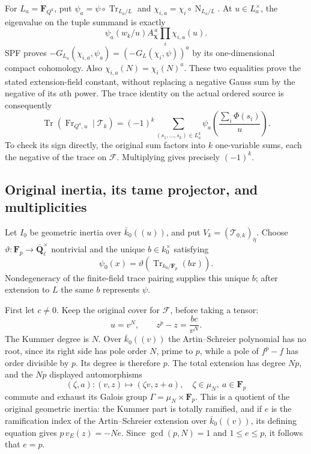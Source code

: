 For \(L_a=\mathbf F_{Q^a}\), put
\(\psi_a=\psi\circ\operatorname{Tr}_{L_a/L}\) and
\(\chi_{i,a}=\chi_i\circ\operatorname{N}_{L_a/L}\).
At \(u\in L_a^\times\), the eigenvalue on the tuple summand
is exactly
\[
 \psi_a(w_k/u) A_{\boldsymbol\chi}^{\,a}
              \prod_i\chi_{i,a}(u).
 \tag{TPF.10}\label{eq:TPF10}
\]
SPF proves \(-G_{L_a}(\chi_{i,a},\psi_a)
=(-G_L(\chi_i,\psi))^a\) by its one-dimensional compact
cohomology. Also \(\chi_{i,a}(N)=\chi_i(N)^a\).
These two equalities prove the stated extension-field
constant, without replacing a negative Gauss sum by
the negative of its \(a\)th power. The trace identity on
the actual ordered source is consequently
\[
 \operatorname{Tr}(\operatorname{Fr}_{Q^a,u}\mid\mathcal T_k)
 =(-1)^k\sum_{(s_1,\ldots,s_k)\in L_a^k}
       \psi_a\left(\frac{\sum_i\Phi(s_i)}u\right).
 \tag{TPF.11}\label{eq:TPF11}
\]
To check its sign directly, the original sum factors into
\(k\) one-variable sums, each the negative of the trace on
\(\mathcal F\). Multiplying gives precisely \((-1)^k\).

\subsection{Original inertia, its tame projector, and multiplicities}

Let \(I_0\) be geometric inertia over \(\bar k_0((u))\),
and put \(V_k=(\mathcal T_{0,k})_{\bar\eta}\).
Choose \(\vartheta:\mathbf F_p\to
\overline{\mathbf Q}_\ell^\times\) nontrivial and the unique
\(b\in k_0^\times\) satisfying
\[
 \psi_0(x)=\vartheta(\operatorname{Tr}_{k_0/\mathbf F_p}(bx)).
 \tag{TPF.12}\label{eq:TPF12}
\]
Nondegeneracy of the finite-field trace pairing supplies
this unique \(b\); after extension to \(L\) the same \(b\)
represents \(\psi\).

First let \(c\ne0\). Keep the original cover for
\(\mathcal F\), before taking a tensor:
\[
 u=v^N,\qquad z^p-z=\frac{bc}{v^N}.
 \tag{TPF.13}\label{eq:TPF13}
\]
The Kummer degree is \(N\). Over \(\bar k_0((v))\) the
Artin--Schreier polynomial has no root, since its right
side has pole order \(N\), prime to \(p\), while a pole
of \(f^p-f\) has order divisible by \(p\). Its degree is
therefore \(p\). The total extension has degree \(Np\),
and the \(Np\) displayed automorphisms
\[
 (\zeta,a):(v,z)\longmapsto(\zeta v,z+a),
 \quad \zeta\in\mu_N,\ a\in\mathbf F_p
 \tag{TPF.14}\label{eq:TPF14}
\]
commute and exhaust its Galois group
\(\Gamma=\mu_N\times\mathbf F_p\). This is a quotient of
the original geometric inertia: the Kummer part is
totally ramified, and if \(e\) is the ramification index
of the Artin--Schreier extension over \(\bar k_0((v))\),
its defining equation gives \(p\,v_E(z)=-Ne\).
Since \(\gcd(p,N)=1\) and \(1\le e\le p\), it follows
that \(e=p\).

